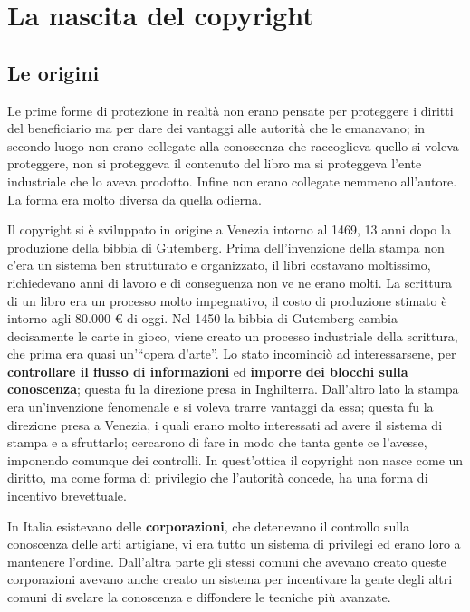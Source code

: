 \chapter{La nascita del copyright}

\section{Le origini}

Le prime forme di protezione in realtà non erano pensate per proteggere i diritti del beneficiario ma per dare dei vantaggi alle autorità che le emanavano; in secondo luogo non erano collegate alla conoscenza che raccoglieva quello si voleva proteggere, non si proteggeva il contenuto del libro ma si proteggeva l'ente industriale che lo aveva prodotto. Infine non erano collegate nemmeno all'autore. La forma era molto diversa da quella odierna.

Il copyright si è sviluppato in origine a Venezia intorno al 1469, 13 anni dopo la produzione della bibbia di Gutemberg. Prima dell'invenzione della stampa non c'era un sistema ben strutturato e organizzato, il libri costavano moltissimo, richiedevano anni di lavoro e di conseguenza non ve ne erano molti. 
La scrittura di un libro era un processo molto impegnativo, il costo di produzione stimato è intorno agli 80.000 \euro{} di oggi. 
Nel 1450 la bibbia di Gutemberg cambia decisamente le carte in gioco, viene creato un processo industriale della scrittura, che prima era quasi un'``opera d'arte''. 
Lo stato incominciò ad interessarsene, per \textbf{controllare il flusso di informazioni} ed \textbf{imporre dei blocchi sulla conoscenza}; questa fu la direzione presa in Inghilterra. 
Dall'altro lato la stampa era un'invenzione fenomenale e si voleva trarre vantaggi da essa; questa fu la direzione presa a Venezia, i quali erano molto interessati ad avere il sistema di stampa e a sfruttarlo; cercarono di fare in modo che tanta gente ce l'avesse, imponendo comunque dei controlli. 
In quest'ottica il copyright non nasce come un diritto, ma come forma di privilegio che l'autorità concede, ha una forma di incentivo brevettuale.

In Italia esistevano delle \textbf{corporazioni}, che detenevano il controllo sulla conoscenza delle arti artigiane, vi era tutto un sistema di privilegi ed erano loro a mantenere l'ordine.
Dall'altra parte gli stessi comuni che avevano creato queste corporazioni avevano anche creato un sistema per incentivare la gente degli altri comuni di svelare la conoscenza e diffondere le tecniche più avanzate. 

